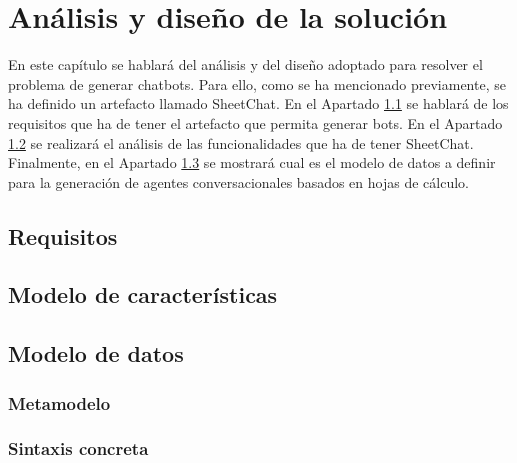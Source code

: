 \chapter{Análisis y diseño de la solución}
\label{cha:AnalysisAndDesign}

En este capítulo se hablará del análisis y del diseño adoptado para resolver el problema de generar chatbots. Para ello, como se ha mencionado previamente, se ha definido un artefacto llamado SheetChat. En el Apartado \ref{sec:Requisitos} se hablará de los requisitos que ha de tener el artefacto que permita generar bots. En el Apartado \ref{sec:FeatureModel} se realizará el análisis de las funcionalidades que ha de tener SheetChat. Finalmente, en el Apartado \ref{sec:DataModel} se mostrará cual es el modelo de datos a definir para la generación de agentes conversacionales basados en hojas de cálculo.

\section{Requisitos}
\label{sec:Requisitos}

\section{Modelo de características}
\label{sec:FeatureModel}

\section{Modelo de datos}
\label{sec:DataModel}

\subsection{Metamodelo}
\label{sec:Metamodel}

\subsection{Sintaxis concreta}
\label{sec:ConcreteSyntax}
